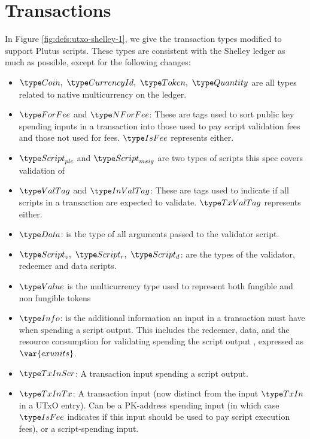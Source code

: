 \section{Transactions}
\label{sec:transactions}

In Figure \ref{fig:defs:utxo-shelley-1}, we give the transaction types modified
to support Plutus scripts. These types are consistent with the Shelley ledger
as much as possible,
except for the following changes:

\begin{itemize}
  \item $\Coin,~\CurrencyId,~\Token,~\Quantity$ are all types
  related to native multicurrency on the ledger.

  \item $\ForFee$ and $\NForFee$: These are tags used to sort public key
  spending inputs in a transaction into those used to pay script validation
  fees and those not used
  for fees. $\IsFee$ represents either.

  \item $\ScriptPlutus$ and $\ScriptMSig$ are two types of scripts this spec
  covers validation of

  \item $\ValTag$ and $\InValTag$: These are tags used to indicate if all scripts
  in a transaction are expected to validate.
  $\TxValTag$ represents either.

  \item $\Data$: is the type of all arguments passed to the validator script.

  \item $\ScriptV,~ \ScriptR,~ \ScriptD$: are the types of the validator,
  redeemer and data scripts.

  \item $\Value$ is the multicurrency type used to represent
  both fungible and non fungible tokens

  \item $\Info$: is the additional information an input in a transaction must
  have when spending a script output. This includes the redeemer,
  data, and
  the resource consumption for validating spending the script output
  , expressed as $\var{exunits}$.

  \item $\TxInScr$: A transaction input spending a script output.

  \item $\TxInTx$: A transaction input (now distinct from the input $\TxIn$ in
  a UTxO entry). Can be a PK-address spending input
  (in which case $\IsFee$ indicates if this input should be used to pay script execution
  fees), or a script-spending input.


\end{itemize}
